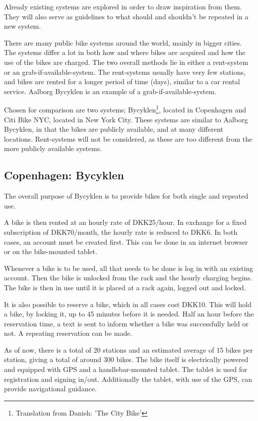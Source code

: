 Already existing systems are explored in order to draw inspiration from them.
They will also serve as guidelines to what should and shouldn't be repeated in a new system.

There are many public bike systems around the world, mainly in bigger cities.
The systems differ a lot in both how and where bikes are acquired and how the use of the bikes are charged.
The two overall methods lie in either a rent-system or an grab-if-available-system.
The rent-systems usually have very few stations, and bikes are rented for a longer period of time (days), similar to a car rental service.
Aalborg Bycyklen is an example of a grab-if-available-system.

Chosen for comparison are two systems; Bycyklen\footnote{Translation from Danish: 'The City Bike'}, located in Copenhagen and Citi Bike NYC, located in New York City.
These systems are similar to Aalborg Bycyklen, in that the bikes are publicly available, and at many different locations.
Rent-systems will not be considered, as these are too different from the more publicly available systems.

\subsection{Copenhagen: Bycyklen}
The overall purpose of Bycyklen\cite{cph_bycyklen} is to provide bikes for both single and repeated use.

A bike is then rented at an hourly rate of DKK25/hour.
In exchange for a fixed subscription of DKK70/month, the hourly rate is reduced to DKK6.
In both cases, an account must be created first.
This can be done in an internet browser or on the bike-mounted tablet.

Whenever a bike is to be used, all that needs to be done is log in with an existing account.
Then the bike is unlocked from the rack and the hourly charging begins.
The bike is then in use until it is placed at a rack again, logged out and locked.

It is also possible to reserve a bike, which in all cases cost DKK10.
This will hold a bike, by locking it, up to 45 minutes before it is needed.
Half an hour before the reservation time, a text is sent to inform whether a bike was successfully held or not.
A repeating reservation can be made.

As of now, there is a total of 20 stations and an estimated average of 15 bikes per station, giving a total of around 300 bikes.
The bike itself is electrically powered and equipped with GPS and a handlebar-mounted tablet.
The tablet is used for registration and signing in/out.
Additionally the tablet, with use of the GPS, can provide navigational guidance.


